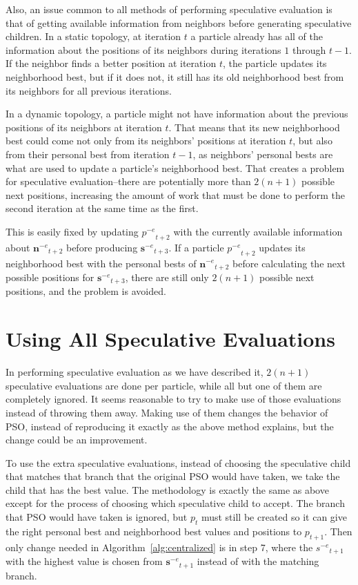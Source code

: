 \documentclass[conference,letterpaper]{IEEEtran}
\newcommand{\alg}[1]{Algorithm~\ref{alg:#1}}
\providecommand{\noeval}[1]{\ensuremath{#1^{-e}}}
\providecommand{\p}{\ensuremath{p}}
\providecommand{\s}{\ensuremath{s}}
\providecommand{\sset}{\ensuremath{\mathbf{s}}}
\providecommand{\nset}{\ensuremath{\mathbf{n}}}
\begin{document}
Also, an issue common to all methods of performing speculative evaluation is
that of getting available information from neighbors before generating
speculative children.  In a static topology, at iteration $t$ a particle
already has all of the information about the positions of its neighbors during
iterations $1$ through $t-1$.  If the neighbor finds a better position at 
iteration $t$, the particle updates its neighborhood best, but if it does not,
it still has its old neighborhood best from its neighbors for all previous 
iterations.

In a dynamic topology, a particle might not have information about the previous
positions of its neighbors at iteration $t$.  That means that its new
neighborhood best could come not only from its neighbors' positions at
iteration $t$, but also from their personal best from iteration $t-1$, as
neighbors' personal bests are what are used to update a particle's neighborhood
best.  That creates a problem for speculative evaluation--there are potentially
more than $2(n+1)$ possible next positions, increasing the amount of work that
must be done to perform the second iteration at the same time as the first.

This is easily fixed by updating $\noeval{\p}_{t+2}$ with the currently
available information about $\noeval{\nset}_{t+2}$ before producing
$\noeval{\sset}_{t+3}$.  If a particle $\noeval{\p}_{t+2}$ updates its 
neighborhood best with the personal bests of $\noeval{\nset}_{t+2}$ before
calculating the next possible positions for $\noeval{\sset}_{t+3}$, there are
still only $2(n+1)$ possible next positions, and the problem is avoided.

\section{Using All Speculative Evaluations}
\label{sec:extra}

In performing speculative evaluation as we have described it, $2(n+1)$
speculative evaluations are done per particle, while all but one of them are
completely ignored.  It seems reasonable to try to make use of those
evaluations instead of throwing them away.  Making use of them changes the
behavior of PSO, instead of reproducing it exactly as the above method
explains, but the change could be an improvement.

To use the extra speculative evaluations, instead of choosing the speculative
child that matches that branch that the original PSO would have taken, we take
the child that has the best value.  The methodology is exactly the same as
above except for the process of choosing which speculative child to accept.
The branch that PSO would have taken is ignored, but $\p_t$ must still be
created so it can give the right personal best and neighborhood best values and
positions to $\p_{t+1}$.  Then only change needed in \alg{centralized} is in
step 7, where the $\noeval{\s}_{t+1}$ with the highest value is chosen from
$\noeval{\sset}_{t+1}$ instead of with the matching branch.
\end{document}
